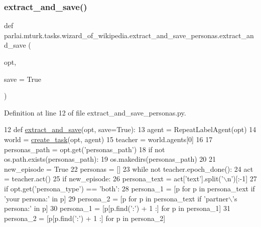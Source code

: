 \subsubsection{\texorpdfstring{extract\+\_\+and\+\_\+save()}{extract\_and\_save()}}
{\footnotesize\ttfamily def parlai.\+mturk.\+tasks.\+wizard\+\_\+of\+\_\+wikipedia.\+extract\+\_\+and\+\_\+save\+\_\+personas.\+extract\+\_\+and\+\_\+save (\begin{DoxyParamCaption}\item[{}]{opt,  }\item[{}]{save = {\ttfamily True} }\end{DoxyParamCaption})}



Definition at line 12 of file extract\+\_\+and\+\_\+save\+\_\+personas.\+py.


\begin{DoxyCode}
12 \textcolor{keyword}{def }\hyperlink{namespacepersonachat__eval_1_1extract__and__save__personas_a7bae99c34a0b3f49cbce1328146926fd}{extract\_and\_save}(opt, save=True):
13     agent = RepeatLabelAgent(opt)
14     world = \hyperlink{namespaceparlai_1_1core_1_1worlds_a79969c7ba76d4b3c500f5bb776444dc6}{create\_task}(opt, agent)
15     teacher = world.agents[0]
16 
17     personas\_path = opt.get(\textcolor{stringliteral}{'personas\_path'})
18     \textcolor{keywordflow}{if} \textcolor{keywordflow}{not} os.path.exists(personas\_path):
19         os.makedirs(personas\_path)
20 
21     new\_episode = \textcolor{keyword}{True}
22     personas = []
23     \textcolor{keywordflow}{while} \textcolor{keywordflow}{not} teacher.epoch\_done():
24         act = teacher.act()
25         \textcolor{keywordflow}{if} new\_episode:
26             persona\_text = act[\textcolor{stringliteral}{'text'}].split(\textcolor{stringliteral}{'\(\backslash\)n'})[:-1]
27             \textcolor{keywordflow}{if} opt.get(\textcolor{stringliteral}{'persona\_type'}) == \textcolor{stringliteral}{'both'}:
28                 persona\_1 = [p \textcolor{keywordflow}{for} p \textcolor{keywordflow}{in} persona\_text \textcolor{keywordflow}{if} \textcolor{stringliteral}{'your persona:'} \textcolor{keywordflow}{in} p]
29                 persona\_2 = [p \textcolor{keywordflow}{for} p \textcolor{keywordflow}{in} persona\_text \textcolor{keywordflow}{if} \textcolor{stringliteral}{'partner\(\backslash\)'s persona:'} \textcolor{keywordflow}{in} p]
30                 persona\_1 = [p[p.find(\textcolor{stringliteral}{':'}) + 1 :] \textcolor{keywordflow}{for} p \textcolor{keywordflow}{in} persona\_1]
31                 persona\_2 = [p[p.find(\textcolor{stringliteral}{':'}) + 1 :] \textcolor{keywordflow}{for} p \textcolor{keywordflow}{in} persona\_2]

\end{DoxyCode}
